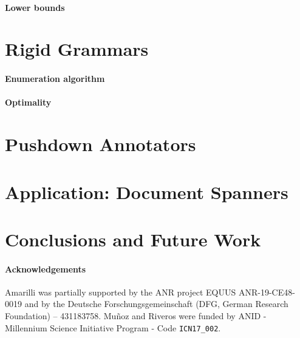 % 

\paragraph{Lower bounds}


\section{Rigid Grammars} \label{sec:quadratic}


\label{sec:profile}


\paragraph{Enumeration algorithm}


\paragraph{Optimality}


\section{Pushdown Annotators} \label{sec:linear}



\section{Application: Document Spanners} \label{sec:spanners}



\section{Conclusions and Future Work}


\paragraph{Acknowledgements}
Amarilli was partially supported by the ANR project EQUUS
ANR-19-CE48-0019 and by the Deutsche Forschungsgemeinschaft (DFG, German
Research Foundation) – 431183758. Muñoz and Riveros were funded by ANID - Millennium Science Initiative Program - Code \verb|ICN17_002|.


